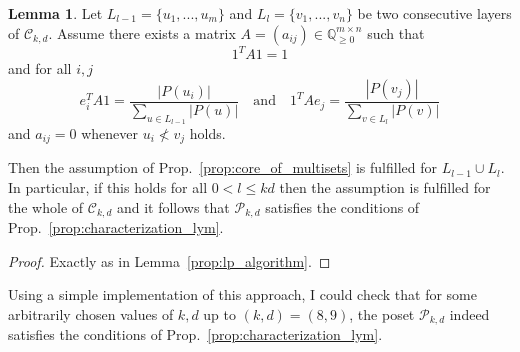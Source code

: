 \documentclass{scrartcl}
\newcommand{\Q}{\mathbb{Q}}
\theoremstyle{definition}
\newtheorem{lemma}[definition]{Lemma}
\begin{document}
\begin{lemma}
    Let $L_{l - 1} = \{u_1, ..., u_m\}$ and $L_l = \{v_1, ..., v_n\}$ be two consecutive layers of $\mathcal{C}_{k, d}$.
    Assume there exists a matrix $A = (a_{ij}) \in \Q_{\geq 0}^{m \times n}$ such that 
    \begin{equation*}
        1^T A 1 = 1
    \end{equation*}
    and for all $i, j$
    \begin{equation*}
        e_i^T A 1 = \frac {|P(u_i)|} {\sum_{u \in L_{l - 1}} |P(u)|} \quad \text{and} \quad 1^T A e_j = \frac {|P(v_j)|} {\sum_{v \in L_l} |P(v)|}
    \end{equation*}
    and $a_{ij} = 0$ whenever $u_i \not< v_j$ holds.

    Then the assumption of Prop.~\ref{prop:core_of_multisets} is fulfilled for $L_{l - 1} \cup L_l$.
    In particular, if this holds for all $0 < l \leq kd$ then the assumption is fulfilled for the whole of $\mathcal{C}_{k, d}$ and it follows that $\mathcal{P}_{k, d}$ satisfies the conditions of Prop.~\ref{prop:characterization_lym}.
\end{lemma}
\begin{proof}
    Exactly as in Lemma~\ref{prop:lp_algorithm}.
\end{proof}
Using a simple implementation of this approach, I could check that for some arbitrarily chosen values of $k, d$ up to $(k, d) = (8, 9)$, the poset $\mathcal{P}_{k, d}$ indeed satisfies the conditions of Prop.~\ref{prop:characterization_lym}.
\end{document}
